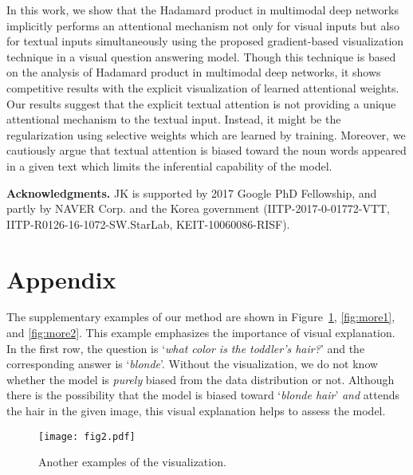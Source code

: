 \documentclass{article}
\begin{document}
In this work, we show that the Hadamard product in multimodal deep networks implicitly performs an attentional mechanism not only for visual inputs but also for textual inputs simultaneously using the proposed gradient-based visualization technique in a visual question answering model. 
Though this technique is based on the analysis of Hadamard product in multimodal deep networks, it shows competitive results with the explicit visualization of learned attentional weights.
Our results suggest that the explicit textual attention is not providing a unique attentional mechanism to the textual input. Instead, it might be the regularization using selective weights which are learned by training.
Moreover, we cautiously argue that textual attention is biased toward the noun words appeared in a given text which limits the inferential capability of the model.

{\small
\vspace{1em}\noindent\textbf{Acknowledgments.}
JK is supported by 2017 Google PhD Fellowship, and partly by NAVER Corp. and the Korea government (IITP-2017-0-01772-VTT, IITP-R0126-16-1072-SW.StarLab, KEIT-10060086-RISF).
}

\newpage




\clearpage

\setcounter{section}{0}
\renewcommand\theHsection{\Alph{section}}
\renewcommand\thesection{\Alph{section}}
\renewcommand\thesubsection{\thesection.\arabic{subsection}}

\section{Appendix}

The supplementary examples of our method are shown in Figure~\ref{fig:more}, \ref{fig:more1}, and \ref{fig:more2}. This example emphasizes the importance of visual explanation. In the first row, the question is `\textit{what color is the toddler's hair?}' and the corresponding answer is `\textit{blonde}'. Without the visualization, we do not know whether the model is \textit{purely} biased from the data distribution or not. Although there is the possibility that the model is biased toward `\textit{blonde hair}' \textit{and} attends the hair in the given image, this visual explanation helps to assess the model.

\begin{figure}[h]
  \centering
  \texttt{[image: fig2.pdf]}
  \caption{Another examples of the visualization.}
  \label{fig:more}
\end{figure}
\end{document}
